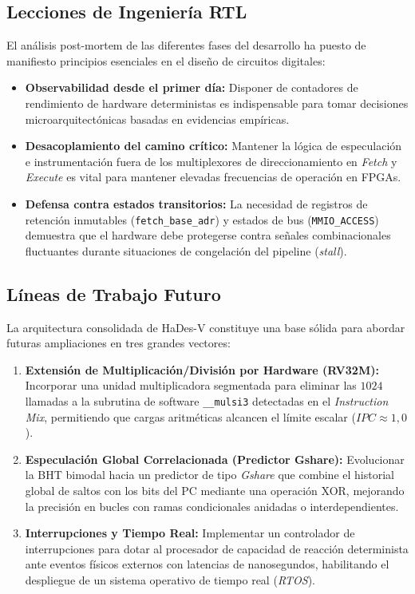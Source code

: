 \documentclass[10pt,a4paper]{article}
\begin{document}
\subsection{Lecciones de Ingeniería RTL}
El análisis post-mortem de las diferentes fases del desarrollo ha puesto de manifiesto principios esenciales en el diseño de circuitos digitales:
\begin{itemize}
    \item \textbf{Observabilidad desde el primer día:} Disponer de contadores de rendimiento de hardware deterministas es indispensable para tomar decisiones
    microarquitectónicas basadas en evidencias empíricas.
    \item \textbf{Desacoplamiento del camino crítico:} Mantener la lógica de especulación e instrumentación fuera de los multiplexores de direccionamiento en
    \textit{Fetch} y \textit{Execute} es vital para mantener elevadas frecuencias de operación en FPGAs.
    \item \textbf{Defensa contra estados transitorios:} La necesidad de registros de retención inmutables (\texttt{fetch\_}\allowbreak\texttt{base\_}\allowbreak\texttt{adr}) y estados de bus
    (\texttt{MMIO\_ACCESS}) demuestra que el hardware debe protegerse contra señales combinacionales fluctuantes durante situaciones de congelación del pipeline
    (\textit{stall}).
\end{itemize}

\subsection{Líneas de Trabajo Futuro}
La arquitectura consolidada de HaDes-V constituye una base sólida para abordar futuras ampliaciones en tres grandes vectores:

\begin{enumerate}
    \item \textbf{Extensión de Multiplicación/División por Hardware (RV32M):} Incorporar una unidad multiplicadora segmentada para eliminar las $1024$
    llamadas a la subrutina de software \texttt{\_\_mulsi3} detectadas en el \textit{Instruction Mix}, permitiendo que cargas aritméticas alcancen el límite
    escalar ($IPC \approx 1,0$).
    \item \textbf{Especulación Global Correlacionada (Predictor Gshare):} Evolucionar la BHT bimodal hacia un predictor de tipo \textit{Gshare} \cite{hennessy2025} que combine el
    historial global de saltos con los bits del PC mediante una operación XOR, mejorando la precisión en bucles con ramas condicionales anidadas o
    interdependientes.
    \item \textbf{Interrupciones y Tiempo Real:} Implementar un controlador de interrupciones para dotar al procesador de capacidad de
    reacción determinista ante eventos físicos externos con latencias de nanosegundos, habilitando el despliegue de un sistema operativo de tiempo real
    (\textit{RTOS}).
\end{enumerate}
\end{document}
